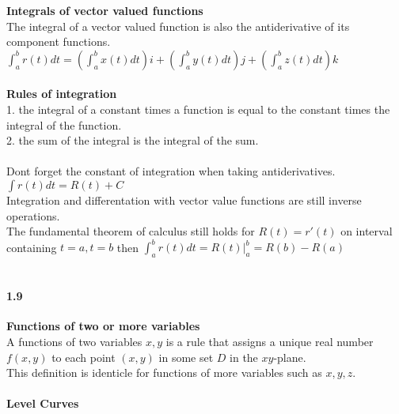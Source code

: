 \documentclass[14pt]{extreport}
\begin{document}
\textbf{Integrals of vector valued functions}\\

The integral of a vector valued function is also the antiderivative of its component functions.\\

$\int_{a}^{b} r(t)dt = (\int_{a}^{b} x(t)dt)i + (\int_{a}^{b} y(t)dt)j + (\int_{a}^{b} z(t)dt)k$\\\\

\textbf{Rules of integration}\\

1. the integral of a constant times a function is equal to the constant times the integral of the function.\\

2. the sum of the integral is the integral of the sum.\\\\

Dont forget the constant of integration when taking antiderivatives.\\

$\int r(t)dt = R(t) + C$\\

Integration and differentation with vector value functions are still inverse operations.\\

The fundamental theorem of calculus still holds for $R(t) = r'(t)$ on interval containing $t=a,t=b$ then $\int_{a}^{b} r(t)dt = R(t)|_{a}^{b} = R(b) - R(a)$\\\\



\paragraph{1.9}\textbf{Functions of two or more variables}\\

A functions of two variables $x, y$ is a rule that assigns a unique real number $f(x,y)$ to each point $(x,y)$ in some set $D$ in the $xy$-plane.\\

This definition is identicle for functions of more variables such as $x, y, z$.\\\\

\textbf{Level Curves}\\\\
\end{document}
